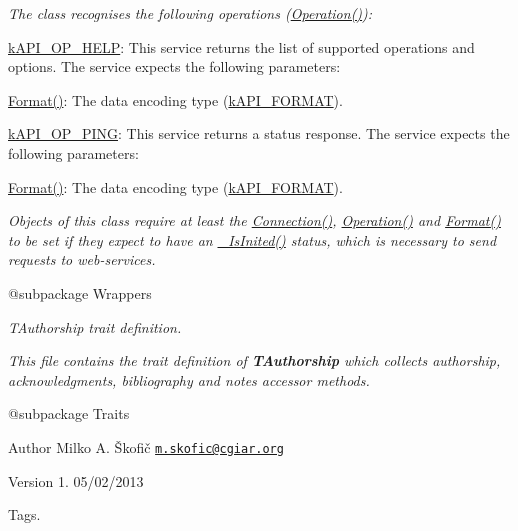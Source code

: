 {\itshape The class recognises the following operations (\hyperlink{}{Operation()})\-:}

{\itshape 
\begin{DoxyItemize}
\item {\ttfamily \hyperlink{}{k\-A\-P\-I\-\_\-\-O\-P\-\_\-\-H\-E\-L\-P}}\-: This service returns the list of supported operations and options. The service expects the following parameters\-: 
\begin{DoxyItemize}
\item {\ttfamily \hyperlink{}{Format()}}\-: The data encoding type (\hyperlink{}{k\-A\-P\-I\-\_\-\-F\-O\-R\-M\-A\-T}). 
\end{DoxyItemize}
\item {\ttfamily \hyperlink{}{k\-A\-P\-I\-\_\-\-O\-P\-\_\-\-P\-I\-N\-G}}\-: This service returns a status response. The service expects the following parameters\-: 
\begin{DoxyItemize}
\item {\ttfamily \hyperlink{}{Format()}}\-: The data encoding type (\hyperlink{}{k\-A\-P\-I\-\_\-\-F\-O\-R\-M\-A\-T}). 
\end{DoxyItemize}
\end{DoxyItemize}}

{\itshape Objects of this class require at least the \hyperlink{}{Connection()}, \hyperlink{}{Operation()} and \hyperlink{}{Format()} to be set if they expect to have an \hyperlink{}{\-\_\-\-Is\-Inited()} status, which is necessary to send requests to web-\/services.}

{\itshape \begin{DoxyVerb} @subpackage        Wrappers\end{DoxyVerb}
}

{\itshape {\itshape T\-Authorship} trait definition.}

{\itshape This file contains the trait definition of {\bfseries T\-Authorship} which collects authorship, acknowledgments, bibliography and notes accessor methods.}

{\itshape \begin{DoxyVerb} @subpackage        Traits
\end{DoxyVerb}
}

{\itshape \begin{DoxyAuthor}{Author}
Milko A. Škofič \href{mailto:m.skofic@cgiar.org}{\tt m.\-skofic@cgiar.\-org} 
\end{DoxyAuthor}
\begin{DoxyVersion}{Version}
1. 05/02/2013
\end{DoxyVersion}
Tags.}


